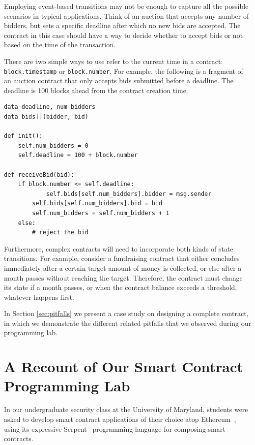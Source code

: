 \documentclass{llncs}
\begin{document}
{Employing event-based transitions may not be enough to capture all the possible scenarios in typical applications. Think of an auction that accepts any number of bidders, but sets a specific deadline after which no new bids are accepted. The contract in this case should have a way to decide whether to accept bids or not based on the time of the transaction.

There are two simple ways to use refer to the current time in a contract: \texttt{block.timestamp} or \texttt{block.number}. For example, the following is a fragment of an auction contract that only accepts bids submitted before a deadline. The deadline is 100 blocks ahead from the contract creation time.

\begin{mdframed}
\begin{verbatim}
data deadline, num_bidders
data bids[](bidder, bid)

def init():
	self.num_bidders = 0
	self.deadline = 100 + block.number                

def receiveBid(bid):
	if block.number <= self.deadline:
    		self.bids[self.num_bidders].bidder = msg.sender
		self.bids[self.num_bidders].bid = bid
		self.num_bidders = self.num_bidders + 1
	else:
		# reject the bid
\end{verbatim}
\end{mdframed}                

Furthermore, complex contracts will need to incorporate both kinds of state transitions. For example, consider a fundraising contract that either concludes immediately after a certain target amount of money is collected, or else after a month passes without reaching the target. Therefore, the contract must change its state if a month passes, or when the contract balance exceeds a threshold, whatever happens first.

In Section \ref{sec:pitfalls} we present a case study on designing a complete contract, in which we demonstrate the different related pitfalls that we observed during our programming lab.
}

\section{A Recount of Our Smart Contract Programming Lab}
\label{sec:lab}
In our undergraduate security class at the University of Maryland,
students were asked to develop smart contract applications of their choice
atop Ethereum~\cite{ethereum}, using its expressive Serpent~\cite{serpent} programming language for composing smart contracts. 
\end{document}
